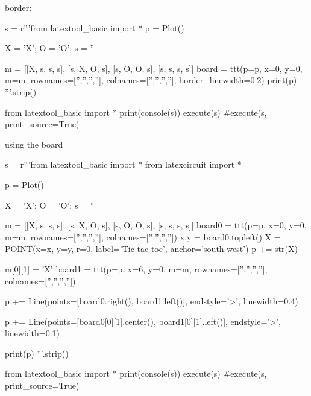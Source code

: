 \newpage
border:
\begin{python}
s = r'''from latextool_basic import *
p = Plot()

X = 'X'; O = 'O'; s = ''

m = [[X, s, s, s],
     [s, X, O, s],
     [s, O, O, s],
     [s, s, s, s]]
board = ttt(p=p, x=0, y=0,
            m=m,
            rownames=['','','',''], colnames=['','','',''],
            border_linewidth=0.2)
print(p)
'''.strip()

from latextool_basic import *
print(console(s))
execute(s)
#execute(s, print_source=True)
\end{python}

\newpage
using the board
\begin{python}
s = r'''from latextool_basic import *
from latexcircuit import *

p = Plot()

X = 'X'; O = 'O'; s = ''

m = [[X, s, s, s],
     [s, X, O, s],
     [s, O, O, s],
     [s, s, s, s]]
board0 = ttt(p=p, x=0, y=0,
            m=m,
            rownames=['','','',''], colnames=['','','',''])
x,y = board0.topleft()
X = POINT(x=x, y=y, r=0, label='Tic-tac-toe', anchor='south west')
p += str(X)

m[0][1] = 'X'
board1 = ttt(p=p, x=6, y=0,
             m=m,
             rownames=['','','',''], colnames=['','','',''])

p += Line(points=[board0.right(), board1.left()], endstyle='>', linewidth=0.4)

p += Line(points=[board0[0][1].center(),
                  board1[0][1].left()], endstyle='>', linewidth=0.1)

print(p)
'''.strip()

from latextool_basic import *
print(console(s))
execute(s)
#execute(s, print_source=True)
\end{python}

